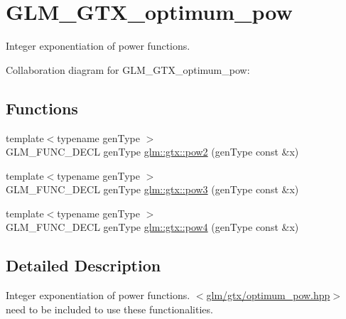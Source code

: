 \hypertarget{group__gtx__optimum__pow}{\section{G\-L\-M\-\_\-\-G\-T\-X\-\_\-optimum\-\_\-pow}
\label{group__gtx__optimum__pow}
}


Integer exponentiation of power functions.  


Collaboration diagram for G\-L\-M\-\_\-\-G\-T\-X\-\_\-optimum\-\_\-pow\-:
\subsection*{Functions}
\begin{DoxyCompactItemize}
\item 
{\footnotesize template$<$typename gen\-Type $>$ }\\G\-L\-M\-\_\-\-F\-U\-N\-C\-\_\-\-D\-E\-C\-L gen\-Type \hyperlink{group__gtx__optimum__pow_ga19aaff3213bf23bdec3ef124ace237e9}{glm\-::gtx\-::pow2} (gen\-Type const \&x)
\item 
{\footnotesize template$<$typename gen\-Type $>$ }\\G\-L\-M\-\_\-\-F\-U\-N\-C\-\_\-\-D\-E\-C\-L gen\-Type \hyperlink{group__gtx__optimum__pow_ga35689d03cd434d6ea819f1942d3bf82e}{glm\-::gtx\-::pow3} (gen\-Type const \&x)
\item 
{\footnotesize template$<$typename gen\-Type $>$ }\\G\-L\-M\-\_\-\-F\-U\-N\-C\-\_\-\-D\-E\-C\-L gen\-Type \hyperlink{group__gtx__optimum__pow_gacef0968763026e180e53e735007dbf5a}{glm\-::gtx\-::pow4} (gen\-Type const \&x)
\end{DoxyCompactItemize}


\subsection{Detailed Description}
Integer exponentiation of power functions. $<$\hyperlink{optimum__pow_8hpp}{glm/gtx/optimum\-\_\-pow.\-hpp}$>$ need to be included to use these functionalities. 

